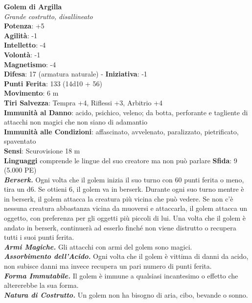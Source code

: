 \begin{multicols}{2}
\medskip\textbf{Golem di Argilla}\\
\emph{Grande costrutto, disallineato}\\
\textbf{Potenza}: +5\\
\textbf{Agilità}: -1\\
\textbf{Intelletto}: -4\\
\textbf{Volontà}: -1\\
\textbf{Magnetismo}: -4\\
\textbf{Difesa}: 17 (armatura naturale) - \textbf{Iniziativa}: -1\\
\textbf{Punti Ferita}: 133 (14d10 + 56)\\
\textbf{Movimento}: 6 m\\
\textbf{Tiri Salvezza}: Tempra +4, Riflessi +3, Arbitrio +4\\
\textbf{Immunità al Danno}: acido, psichico, veleno; da botta, perforante e tagliente di attacchi non magici che non siano di adamantio\\
\textbf{Immunità alle Condizioni}: affascinato, avvelenato, paralizzato, pietrificato, spaventato\\
\textbf{Sensi}: Scurovisione 18 m\\
\textbf{Linguaggi} comprende le lingue del suo creatore ma non può parlare
\textbf{Sfida}: 9 (5.000 PE)\smallskip\\
\emph{\textbf{Berserk.}} Ogni volta che il golem inizia il suo turno con 60 punti ferita o meno, tira un d6. Se ottieni 6, il golem va in berserk. Durante ogni suo turno mentre è in berserk, il golem attacca la creatura più vicina che può vedere. Se non c'è nessuna creatura abbastanza vicina da muoversi e attaccarla, il golem attacca un oggetto, con preferenza per gli oggetti più piccoli di lui. Una volta che il golem è andato in berserk, continuerà ad esserlo finché non viene distrutto o recupera tutti i suoi punti ferita.\\
\emph{\textbf{Armi Magiche.}} Gli attacchi con armi del golem sono magici.\\
\emph{\textbf{Assorbimento dell'Acido.}} Ogni volta che il golem è vittima di danni da acido, non subisce danni ma invece recupera un pari numero di punti ferita.\\
\emph{\textbf{Forma Immutabile.}} Il golem è immune a qualsiasi incantesimo o effetto che altererebbe la sua forma. \\
\emph{\textbf{Natura di Costrutto.}} Un golem non ha bisogno di aria, cibo, bevande o sonno.\\

\end{multicols}
